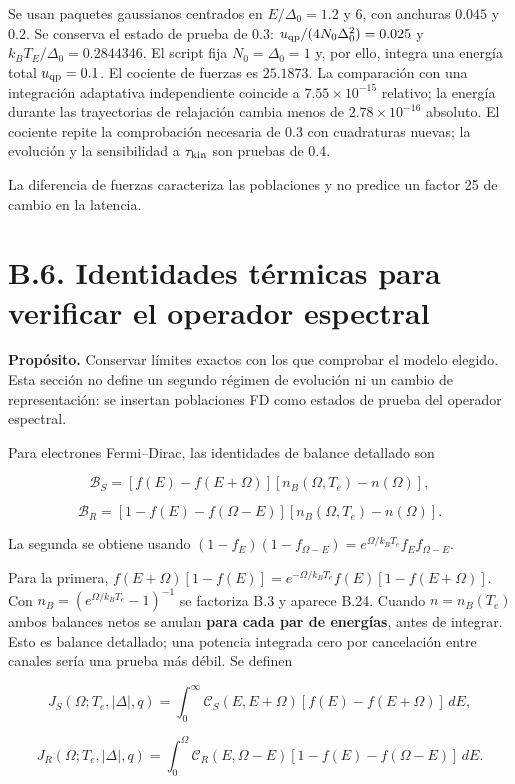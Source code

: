 \documentclass[
  spanish,
  10pt,
  a4paper,
]{article}
\begin{document}
Se usan paquetes gaussianos centrados en \(E/\Delta_0=1.2\) y \(6\), con
anchuras \(0.045\) y \(0.2\). Se conserva el estado de prueba de 0.3:
\(u_{\rm qp}/(4N_0\Delta_0^2)=0.025\) y \(k_BT_E/\Delta_0=0.2844346\).
El script fija \(N_0=\Delta_0=1\) y, por ello, integra una energía total
\(u_{\rm qp}=0.1\). El cociente de fuerzas es \(25.1873\). La
comparación con una integración adaptativa independiente coincide a
\(7.55\times10^{-15}\) relativo; la energía durante las trayectorias de
relajación cambia menos de \(2.78\times10^{-16}\) absoluto. El cociente
repite la comprobación necesaria de 0.3 con cuadraturas nuevas; la
evolución y la sensibilidad a \(\tau_{\rm kin}\) son pruebas de 0.4.

La diferencia de fuerzas caracteriza las poblaciones y no predice un
factor 25 de cambio en la latencia.

\section{B.6. Identidades térmicas para verificar el operador
espectral}\label{b.6.-identidades-tuxe9rmicas-para-verificar-el-operador-espectral}

\textbf{Propósito.} Conservar límites exactos con los que comprobar el
modelo elegido. Esta sección no define un segundo régimen de evolución
ni un cambio de representación: se insertan poblaciones FD como estados
de prueba del operador espectral.

Para electrones Fermi--Dirac, las identidades de balance detallado son

\[
\mathcal B_S=[f(E)-f(E+\Omega)]
[n_B(\Omega,T_e)-n(\Omega)], \tag{B.24}
\]

\[
\mathcal B_R=[1-f(E)-f(\Omega-E)]
[n_B(\Omega,T_e)-n(\Omega)]. \tag{B.25}
\]

La segunda se obtiene usando
\((1-f_E)(1-f_{\Omega-E})=e^{\Omega/k_BT_e}f_Ef_{\Omega-E}\).

Para la primera,
\(f(E+\Omega)[1-f(E)]=e^{-\Omega/k_BT_e}f(E)[1-f(E+\Omega)]\). Con
\(n_B=(e^{\Omega/k_BT_e}-1)^{-1}\) se factoriza B.3 y aparece B.24.
Cuando \(n=n_B(T_e)\) ambos balances netos se anulan \textbf{para cada
par de energías}, antes de integrar. Esto es balance detallado; una
potencia integrada cero por cancelación entre canales sería una prueba
más débil. Se definen

\[
J_S(\Omega;T_e,|\Delta|,q)=\int_0^\infty
\mathcal C_S(E,E+\Omega)[f(E)-f(E+\Omega)]\,dE, \tag{B.26}
\]

\[
J_R(\Omega;T_e,|\Delta|,q)=\int_0^\Omega
\mathcal C_R(E,\Omega-E)[1-f(E)-f(\Omega-E)]\,dE. \tag{B.27}
\]
\end{document}
